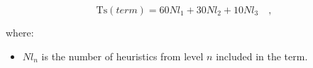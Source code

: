 \documentclass[a4paper, 12pt]{book}
\begin{document}
\begin{center}
    \begin{equation}
        \mathrm {Ts}(term) = 60Nl_{1} + 30Nl_{2} + 10Nl_{3}\quad ,
    \end{equation}
\end{center}

where:
\begin{itemize}
    \item $Nl_{n}$ is the number of heuristics from level $n$ included in the term.
\end{itemize}



\end{document}
